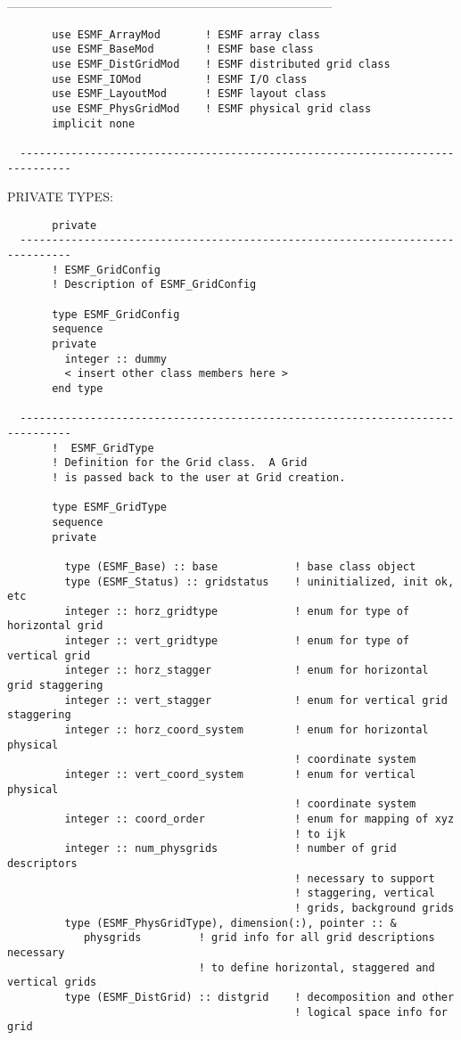   ------------------------------------------------------------------------------
\begin{verbatim}       use ESMF_ArrayMod       ! ESMF array class
       use ESMF_BaseMod        ! ESMF base class
       use ESMF_DistGridMod    ! ESMF distributed grid class
       use ESMF_IOMod          ! ESMF I/O class
       use ESMF_LayoutMod      ! ESMF layout class
       use ESMF_PhysGridMod    ! ESMF physical grid class
       implicit none
 
  ------------------------------------------------------------------------------\end{verbatim}{\sf PRIVATE TYPES:}
\begin{verbatim}       private
  ------------------------------------------------------------------------------
       ! ESMF_GridConfig
       ! Description of ESMF_GridConfig
 
       type ESMF_GridConfig
       sequence
       private
         integer :: dummy
         < insert other class members here >
       end type
 
  ------------------------------------------------------------------------------
       !  ESMF_GridType
       ! Definition for the Grid class.  A Grid
       ! is passed back to the user at Grid creation.
 
       type ESMF_GridType
       sequence
       private
 
         type (ESMF_Base) :: base            ! base class object
         type (ESMF_Status) :: gridstatus    ! uninitialized, init ok, etc
         integer :: horz_gridtype            ! enum for type of horizontal grid
         integer :: vert_gridtype            ! enum for type of vertical grid
         integer :: horz_stagger             ! enum for horizontal grid staggering
         integer :: vert_stagger             ! enum for vertical grid staggering
         integer :: horz_coord_system        ! enum for horizontal physical
                                             ! coordinate system
         integer :: vert_coord_system        ! enum for vertical physical
                                             ! coordinate system
         integer :: coord_order              ! enum for mapping of xyz 
                                             ! to ijk
         integer :: num_physgrids            ! number of grid descriptors
                                             ! necessary to support
                                             ! staggering, vertical
                                             ! grids, background grids
         type (ESMF_PhysGridType), dimension(:), pointer :: &
            physgrids         ! grid info for all grid descriptions necessary
                              ! to define horizontal, staggered and vertical grids
         type (ESMF_DistGrid) :: distgrid    ! decomposition and other
                                             ! logical space info for grid
 

\end{verbatim}
